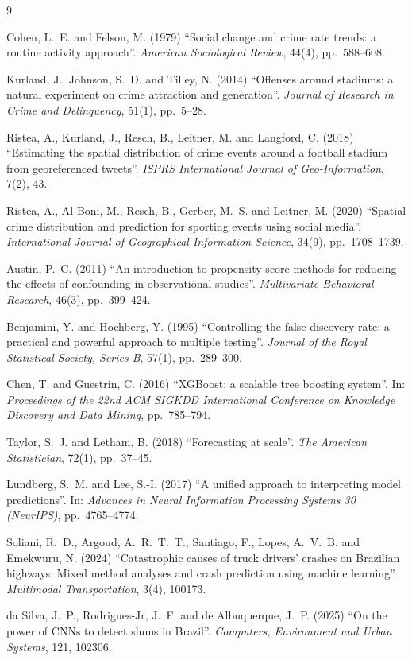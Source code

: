 \documentclass[12pt]{article}
\begin{document}
\begin{thebibliography}{9}

 Cohen, L.~E. and Felson, M. (1979) ``Social change and
crime rate trends: a routine activity approach''. \emph{American
Sociological Review}, 44(4), pp.~588--608.

 Kurland, J., Johnson, S.~D. and Tilley, N. (2014)
``Offenses around stadiums: a natural experiment on crime attraction and
generation''. \emph{Journal of Research in Crime and Delinquency}, 51(1),
pp.~5--28.

 Ristea, A., Kurland, J., Resch, B., Leitner, M. and
Langford, C. (2018) ``Estimating the spatial distribution of crime events
around a football stadium from georeferenced tweets''. \emph{ISPRS
International Journal of Geo-Information}, 7(2), 43.

 Ristea, A., Al Boni, M., Resch, B., Gerber, M.~S. and
Leitner, M. (2020) ``Spatial crime distribution and prediction for
sporting events using social media''. \emph{International Journal of
Geographical Information Science}, 34(9), pp.~1708--1739.

 Austin, P.~C. (2011) ``An introduction to propensity
score methods for reducing the effects of confounding in observational
studies''. \emph{Multivariate Behavioral Research}, 46(3), pp.~399--424.

 Benjamini, Y. and Hochberg, Y. (1995) ``Controlling the
false discovery rate: a practical and powerful approach to multiple
testing''. \emph{Journal of the Royal Statistical Society, Series B},
57(1), pp.~289--300.

 Chen, T. and Guestrin, C. (2016) ``XGBoost: a scalable
tree boosting system''. In: \emph{Proceedings of the 22nd ACM SIGKDD
International Conference on Knowledge Discovery and Data Mining},
pp.~785--794.

 Taylor, S.~J. and Letham, B. (2018) ``Forecasting at
scale''. \emph{The American Statistician}, 72(1), pp.~37--45.

 Lundberg, S.~M. and Lee, S.-I. (2017) ``A unified
approach to interpreting model predictions''. In: \emph{Advances in
Neural Information Processing Systems 30 (NeurIPS)}, pp.~4765--4774.

 Soliani, R.~D., Argoud, A.~R.~T.~T., Santiago, F.,
Lopes, A.~V.~B. and Emekwuru, N. (2024) ``Catastrophic causes of truck
drivers' crashes on Brazilian highways: Mixed method analyses and crash
prediction using machine learning''. \emph{Multimodal Transportation},
3(4), 100173.

 da Silva, J.~P., Rodrigues-Jr, J.~F. and de
Albuquerque, J.~P. (2025) ``On the power of CNNs to detect slums in
Brazil''. \emph{Computers, Environment and Urban Systems}, 121, 102306.

\end{thebibliography}
\end{document}
